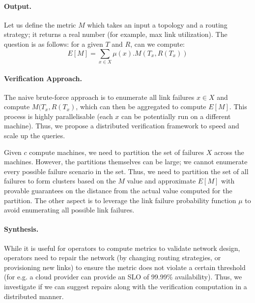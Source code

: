 \documentclass[]{article}
\begin{document}
\paragraph{Output.} Let us define the
metric $M$ which takes an input a topology and a routing 
strategy; it returns a 
real number (for example, max link utilization). 
The question is as follows: for a given $T$ and $R$,
can we compute: 
\[
	E[M] = \sum_{x \in X} \mu(x). M(T_x, R(T_x))
\]

\paragraph{Verification Approach.} The naive brute-force 
approach is to enumerate all link failures $x \in X$
and compute $M(T_x, R(T_x)$, which can then be aggregated to 
compute $E[M]$. This process is highly parallelisable (each 
$x$ can be potentially run on a different machine). Thus, we
propose a distributed verification framework to speed and 
scale up the queries.  

Given $c$ compute machines, we need to partition
the set of failures $X$ across
 the machines. However, the partitions themselves
 can be large; we cannot enumerate
 every possible failure scenario in the set. 
 Thus, we need to partition the set of all failures
 to form clusters based on the $M$ value 
 and approximate $E[M]$ with 
 provable guarantees on the distance from the actual 
 value computed for the partition. The other aspect 
 is to leverage the link failure probability function
 $\mu$ to avoid enumerating all possible link failures.
 
  

\paragraph{Synthesis.} While it is useful for operators
to compute metrics to validate network design, operators need
to repair the network (by changing routing strategies, or 
provisioning new links) to ensure the metric does not violate
a certain threshold (for e.g. a cloud provider can provide 
an SLO of 99.99\% availability). Thus, we investigate 
if we can suggest repairs along with the verification computation
in a distributed manner. 
 
 
\begin{small}
	
\end{small}
\end{document}
